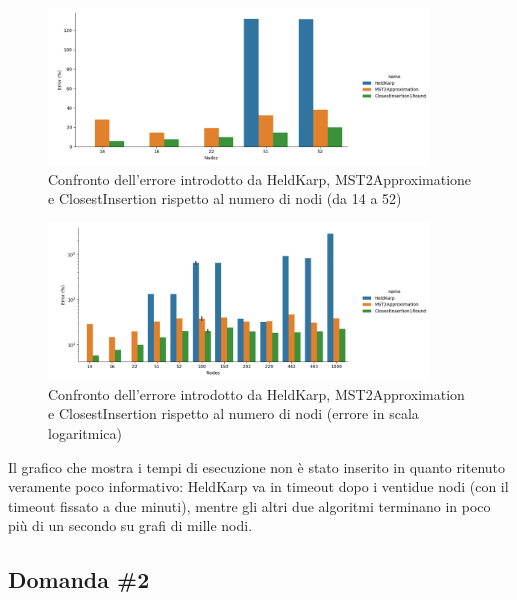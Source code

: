 \begin{figure}[H]
    \centering

    \includegraphics[width=0.9\textwidth]{./images/HeldKarp_vs_MST2Approximation_vs_ClosestInsertion1Round__approximation_error__limited_to_52_nodes_.png}

    \caption{Confronto dell'errore introdotto da HeldKarp, MST2Approximatione e ClosestInsertion rispetto al numero di nodi (da 14 a 52)}
    \label{fig:heldkarp-mst2approx-closestinsertion-accuracy-error-52-nodes}
\end{figure}

\begin{figure}[H]
    \centering

    \includegraphics[width=0.9\textwidth]{./images/HeldKarp_vs_MST2Approximation_vs_ClosestInsertion1Round__approximation_error__y_log_scaled_.png}

    \caption{Confronto dell'errore introdotto da HeldKarp, MST2Approximation e ClosestInsertion rispetto al numero di nodi (errore in scala logaritmica)}
    \label{fig:heldkarp-mst2approx-closestinsertion-accuracy-error}
\end{figure}

Il grafico che mostra i tempi di esecuzione non è stato inserito
in quanto ritenuto veramente poco informativo: HeldKarp va in
timeout dopo i ventidue nodi (con il timeout fissato a due minuti),
mentre gli altri due algoritmi terminano in poco più di un secondo
su grafi di mille nodi.

\subsection{Domanda \#2}
\label{sec:question-2}

